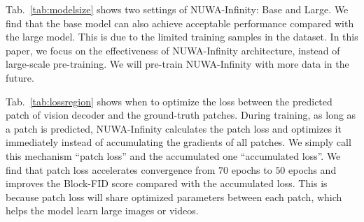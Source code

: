 \documentclass{article}
\begin{document}
Tab.~\ref{tab:modelsize} shows two settings of NUWA-Infinity: Base and Large. We find that the base model can also achieve acceptable performance compared with the large model. This is due to the limited training samples in the dataset. In this paper, we focus on the effectiveness of NUWA-Infinity architecture, instead of large-scale pre-training. We will pre-train NUWA-Infinity with more data in the future.


Tab.~\ref{tab:lossregion} shows when to optimize the loss between the predicted patch of vision decoder and the ground-truth patches. During training, as long as a patch is predicted, NUWA-Infinity calculates the patch loss and optimizes it immediately instead of accumulating the gradients of all patches. We simply call this mechanism ``patch loss'' and the accumulated one ``accumulated loss''. We find that patch loss accelerates convergence from $70$ epochs to $50$ epochs and improves the Block-FID score compared with the accumulated loss. This is because patch loss will share optimized parameters between each patch, which helps the model learn large images or videos.
\end{document}
